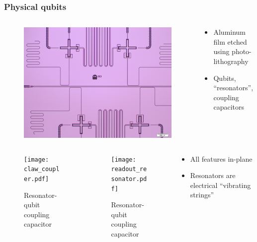 \begin{frame}
\frametitle{Physical qubits}
\begin{columns}
  \begin{column}{0.4\textwidth}
    \begin{figure}
      \includegraphics[scale=0.045]{physical_qubit.jpg}
    \end{figure}
  \end{column}
  \begin{column}{0.6\textwidth}
    \begin{itemize}
      \item Aluminum film etched using photo-lithography
      \item Qubits, ``resonators'', coupling capacitors
    \end{itemize}
  \end{column}
\end{columns}
\begin{columns}
  \begin{column}{0.25\textwidth}
    \begin{figure}
      \texttt{[image: claw\_coupler.pdf]}
      \caption*{Resonator-qubit coupling capacitor}
    \end{figure}
  \end{column}
  \begin{column}{0.25\textwidth}
    \begin{figure}
      \texttt{[image: readout\_resonator.pdf]}
      \caption*{Resonator-qubit coupling capacitor}
    \end{figure}
  \end{column}
  \begin{column}{0.5\textwidth}
    \begin{itemize}
      \item All features in-plane
      \item Resonators are electrical ``vibrating strings''
    \end{itemize}
  \end{column}
\end{columns}
\end{frame}
